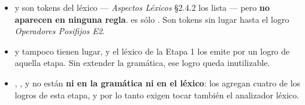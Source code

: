\begin{itemize}
  \item \tl{++} y \tl{-{}-} son tokens del léxico --- \emph{Aspectos Léxicos} \S2.4.2 los lista ---
        pero \textbf{no aparecen en ninguna regla}.  es sólo
        \tl{+} \alt{} \tl{-} \alt{} \tl{!}. Son tokens sin lugar hasta el logro
        \emph{Operadores Posifijos E2}.
  \item {} y  tampoco tienen lugar, y el léxico de la Etapa 1 los emite
        por un logro de aquella etapa. Sin extender la gramática, ese logro queda inutilizable.
  \item {}, ,  y \tl{->} no están \textbf{ni en la gramática ni en el
        léxico}: los agregan cuatro de los logros de esta etapa, y por lo tanto exigen tocar
        también el analizador léxico.
\end{itemize}
